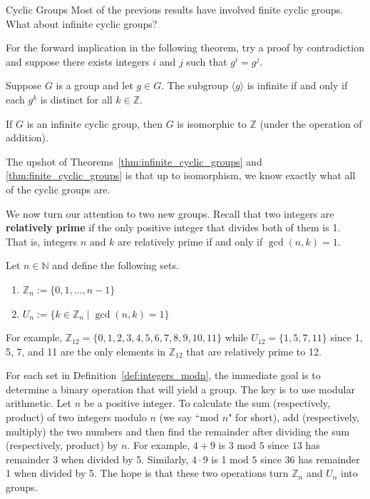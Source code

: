 \begin{section}{Cyclic Groups}
Most of the previous results have involved finite cyclic groups.  What about infinite cyclic groups?

For the forward implication in the following theorem, try a proof by contradiction and suppose there exists integers $i$ and $j$ such that $g^i=g^j$.

\begin{theorem}
Suppose $G$ is a group and let $g\in G$. The subgroup $\langle g\rangle$ is infinite if and only if each $g^k$ is distinct for all $k\in\mathbb{Z}$.
\end{theorem}

\begin{theorem}\label{thm:infinite_cyclic_groups}
If $G$ is an infinite cyclic group, then $G$ is isomorphic to $\mathbb{Z}$ (under the operation of addition).
\end{theorem}

The upshot of Theorems~\ref{thm:infinite_cyclic_groups} and \ref{thm:finite_cyclic_groups} is that up to isomorphism, we know exactly what all of the cyclic groups are.

We now turn our attention to two new groups. Recall that two integers are \textbf{relatively prime} if the only positive integer that divides both of them is 1.  That is, integers $n$ and $k$ are relatively prime if and only if $\gcd(n,k)=1$.

\begin{definition}\label{def:integers_modn}
Let $n\in\mathbb{N}$ and define the following sets.
\begin{enumerate}[label=\textrm{(\alph*)}]
\item $\mathbb{Z}_n:=\{0,1,\ldots,n-1\}$
\item $U_n:=\{k\in\mathbb{Z}_n\mid \gcd(n,k)=1\}$
\end{enumerate}
\end{definition}

\begin{example}
For example, $\mathbb{Z}_{12}=\{0,1,2,3,4,5,6,7,8,9,10,11\}$ while $U_{12}=\{1,5,7,11\}$ since 1, 5, 7, and 11 are the only elements in $\mathbb{Z}_{12}$ that are relatively prime to 12.
\end{example}

For each set in Definition~\ref{def:integers_modn}, the immediate goal is to determine a binary operation that will yield a group.  The key is to use modular arithmetic.  Let $n$ be a positive integer. To calculate the sum (respectively, product) of two integers modulo $n$ (we say ``mod $n$" for short), add (respectively, multiply) the two numbers and then find the remainder after dividing the sum (respectively, product) by $n$. For example, $4+9$ is $3$ mod $5$ since $13$ has remainder 3 when divided by 5.  Similarly, $4\cdot 9$ is 1 mod $5$ since 36 has remainder 1 when divided by 5. The hope is that these two operations turn $\mathbb{Z}_n$ and $U_n$ into groups.


\end{section}
